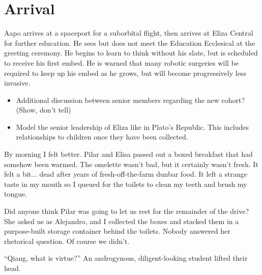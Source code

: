 %
%

\chapter{Arrival}


Aapo arrives at a spaceport for a suborbital flight, then arrives at Eliza Central for further education. He sees but does not meet the Education Ecclesical at the greeting ceremony. He begins to learn to think without his slate, but is scheduled to receive his first embed. He is warned that many robotic surgeries will be required to keep up his embed as he grows, but will become progressively less invasive.

\begin{itemize}
\item Additional discussion between senior members regarding the new cohort? (Show, don't tell)
\item Model the senior leadership of Eliza like in Plato's Republic. This includes relationships to children once they have been collected.
\end{itemize}


By morning I felt better. Pilar and Elisa passed out a boxed breakfast that had somehow been warmed. The omelette wasn't bad, but it certainly wasn't fresh. It felt a bit... dead after years of fresh-off-the-farm dunbar food. It left a strange taste in my mouth so I queued for the toilets to clean my teeth and brush my tongue.

Did anyone think Pilar was going to let us rest for the remainder of the drive? She asked us as Alejandro, and I collected the boxes and stacked them in a purpose-built storage container behind the toilets. Nobody answered her rhetorical question. Of course we didn't.

``Qiang, what is virtue?'' An androgynous, diligent-looking student lifted their head. 



\newpage
\thispagestyle{empty}
